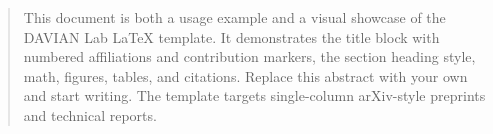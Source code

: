 \begin{abstract}
This document is both a usage example and a visual showcase of the DAVIAN Lab
LaTeX template. It demonstrates the title block with numbered affiliations and
contribution markers, the section heading style, math, figures, tables, and
citations. Replace this abstract with your own and start writing. The template
targets single-column arXiv-style preprints and technical reports.
\end{abstract}
